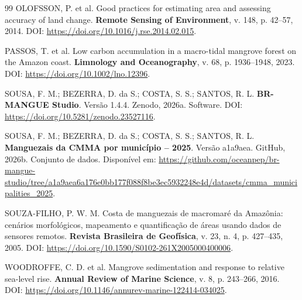 \documentclass[12pt,a4paper]{article}
\begin{document}
\begin{thebibliography}{99}
OLOFSSON, P. et al. Good practices for estimating area and assessing accuracy of land change. \textbf{Remote Sensing of Environment}, v. 148, p. 42--57, 2014. DOI: \url{https://doi.org/10.1016/j.rse.2014.02.015}.

PASSOS, T. et al. Low carbon accumulation in a macro-tidal mangrove forest on the Amazon coast. \textbf{Limnology and Oceanography}, v. 68, p. 1936--1948, 2023. DOI: \url{https://doi.org/10.1002/lno.12396}.

SOUSA, F. M.; BEZERRA, D. da S.; COSTA, S. S.; SANTOS, R. L. \textbf{BR-MANGUE Studio}. Versão 1.4.4. Zenodo, 2026a. Software. DOI: \url{https://doi.org/10.5281/zenodo.23527116}.

SOUSA, F. M.; BEZERRA, D. da S.; COSTA, S. S.; SANTOS, R. L. \textbf{Manguezais da CMMA por município -- 2025}. Versão a1a9aea. GitHub, 2026b. Conjunto de dados. Disponível em: \url{https://github.com/oceanpep/br-mangue-studio/tree/a1a9aea6a176e0bb177f088f8be3ec5932248e4d/datasets/cmma_municipalities_2025}.

SOUZA-FILHO, P. W. M. Costa de manguezais de macromaré da Amazônia: cenários morfológicos, mapeamento e quantificação de áreas usando dados de sensores remotos. \textbf{Revista Brasileira de Geofísica}, v. 23, n. 4, p. 427--435, 2005. DOI: \url{https://doi.org/10.1590/S0102-261X2005000400006}.

WOODROFFE, C. D. et al. Mangrove sedimentation and response to relative sea-level rise. \textbf{Annual Review of Marine Science}, v. 8, p. 243--266, 2016. DOI: \url{https://doi.org/10.1146/annurev-marine-122414-034025}.

\end{thebibliography}
\end{document}
